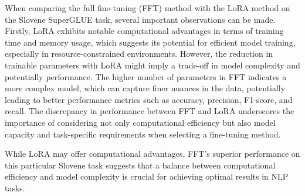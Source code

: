 When comparing the full fine-tuning (FFT) method with the LoRA method on the Slovene SuperGLUE task, several important observations can be made. Firstly, LoRA exhibits notable computational advantages in terms of training time and memory usage, which suggests its potential for efficient model training, especially in resource-constrained environments. However, the reduction in trainable parameters with LoRA might imply a trade-off in model complexity and potentially performance. The higher number of parameters in FFT indicates a more complex model, which can capture finer nuances in the data, potentially leading to better performance metrics such as accuracy, precision, F1-score, and recall. The discrepancy in performance between FFT and LoRA underscores the importance of considering not only computational efficiency but also model capacity and task-specific requirements when selecting a fine-tuning method. 

While LoRA may offer computational advantages, FFT's superior performance on this particular Slovene task suggests that a balance between computational efficiency and model complexity is crucial for achieving optimal results in NLP tasks.
